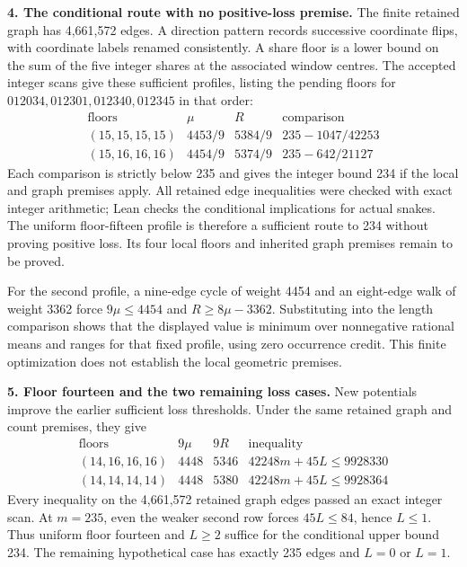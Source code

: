 \documentclass[11pt,a4paper]{article}
\begin{document}
\textbf{4. The conditional route with no positive-loss premise.}
The finite retained graph has 4,661,572 edges. A direction pattern records
successive coordinate flips, with coordinate labels renamed consistently.
A share floor is a lower bound on the sum of the five integer shares
at the associated window centres. The accepted integer scans give
these sufficient profiles, listing the pending floors for
$012034,012301,012340,012345$ in that order:
\[
\begin{array}{c|c|c|c}
\text{floors}&\mu&R&\text{comparison}\\\hline
(15,15,15,15)&4453/9&5384/9&235-1047/42253\\
(15,16,16,16)&4454/9&5374/9&235-642/21127
\end{array}
\]
Each comparison is strictly below 235 and gives the integer bound 234
if the local and graph premises apply. All retained edge inequalities were
checked with exact integer arithmetic; Lean checks the conditional
implications for actual snakes. The uniform floor-fifteen profile is
therefore a sufficient route to 234 without proving positive loss.
Its four local floors and inherited graph premises remain to be proved.

For the second profile, a nine-edge cycle of weight 4454 and an eight-edge
walk of weight 3362 force $9\mu\le4454$ and $R\ge8\mu-3362$.
Substituting into the length comparison shows that the displayed value
is minimum over nonnegative rational means and ranges for that fixed
profile, using zero occurrence credit. This finite optimization does
not establish the local geometric premises.

\textbf{5. Floor fourteen and the two remaining loss cases.}
New potentials improve the earlier sufficient loss thresholds. Under
the same retained graph and count premises, they give
\[
\begin{array}{c|c|c|c}
\text{floors}&9\mu&9R&\text{inequality}\\\hline
(14,16,16,16)&4448&5346&42248m+45L\le9928330\\
(14,14,14,14)&4448&5380&42248m+45L\le9928364
\end{array}
\]
Every inequality on the 4,661,572 retained graph edges passed an exact
integer scan. At $m=235$, even the weaker second row forces
$45L\le84$, hence $L\le1$. Thus uniform floor fourteen and $L\ge2$
suffice for the conditional upper bound 234. The remaining hypothetical
case has exactly 235 edges and $L=0$ or $L=1$.
\end{document}
